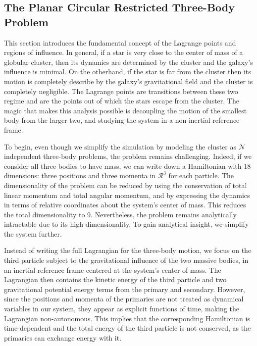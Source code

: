     
    \subsection{The Planar Circular Restricted Three-Body Problem}
        
        This section introduces the fundamental concept of the Lagrange points and regions of influence. In general, if a star is very close to the center of mass of a globular cluster, then its dynamics are determined by the cluster and the galaxy's influence is minimal. On the otherhand, if the star is far from the cluster then its motion is completely describe by the galaxy's gravitational field and the cluster is completely negligible. The Lagrange points are transitions between these two regime and are the points out of which the stars escape from the cluster. The magic that makes this analysis possible is decoupling the motion of the smallest body from the larger two, and studying the system in a non-inertial reference frame. 

        To begin, even though we simplify the simulation by modeling the cluster as $\mathcal{N}$ independent three-body problems, the problem remains challenging. Indeed, if we consider all three bodies to have mass, we can write down a Hamiltonian with 18 dimensions: three positions and three momenta in $\mathcal{R}^3$ for each particle. The dimensionality of the problem can be reduced by using the conservation of total linear momentum and total angular momentum, and by expressing the dynamics in terms of relative coordinates about the system's center of mass. This reduces the total dimensionality to 9. Nevertheless, the problem remains analytically intractable due to its high dimensionality. To gain analytical insight, we simplify the system further.
        
        Instead of writing the full Lagrangian for the three-body motion, we focus on the third particle subject to the gravitational influence of the two massive bodies, in an inertial reference frame centered at the system's center of mass. The Lagrangian then contains the kinetic energy of the third particle and two gravitational potential energy terms from the primary and secondary. However, since the positions and momenta of the primaries are not treated as dynamical variables in our system, they appear as explicit functions of time, making the Lagrangian non-autonomous. This implies that the corresponding Hamiltonian is time-dependent and the total energy of the third particle is not conserved, as the primaries can exchange energy with it.

